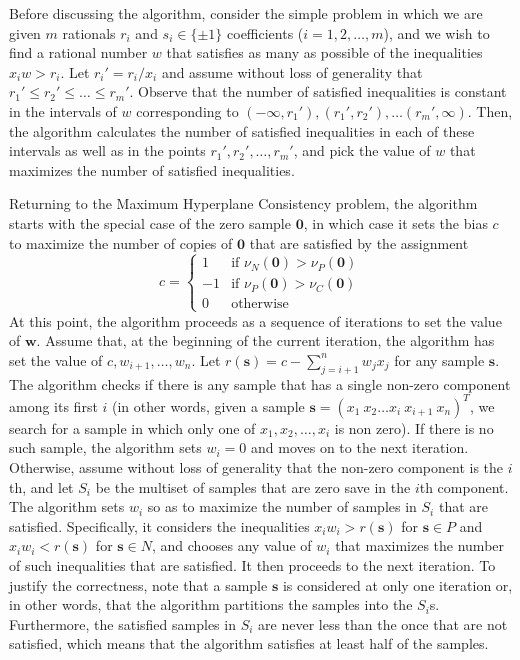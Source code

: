 \documentclass[11pt]{article}
\theoremstyle{definition}
\newcommand{\vect}[1]{\mathbf{#1}}
\begin{document}
Before discussing the algorithm, 
consider the simple problem in which we are given $m$ rationals $r_i$ and 
$s_i \in \{ \pm 1 \}$ coefficients ($i = 1, 2, \dots, m$),
and we wish to find a rational number $w$ that satisfies as many as possible of the inequalities
$x_i w > r_i$.
Let $r_i' = r_i / x_i$ and assume without loss of generality that 
$r_1' \leq r_2' \leq \dots \leq r_m'$.
Observe that the number of satisfied inequalities is constant in the 
intervals of $w$ corresponding to
$(-\infty, r_1'), (r_1', r_2'), \dots (r_m', \infty)$.
Then, the algorithm calculates the number of satisfied inequalities in each of these intervals 
as well as in the points $r_1', r_2', \dots, r_m'$, and pick the
value of $w$ that maximizes the number of satisfied inequalities. 

Returning to the Maximum Hyperplane Consistency problem,  
the algorithm starts with the special case of the zero sample $\vect{0}$, in which 
case it sets the bias $c$ to maximize the number of copies of $\vect{0}$ that are satisfied by
the assignment 
$$c = \begin{cases} 
1 & \text{if } \nu_N(\vect{0}) > \nu_P(\vect{0})\\
-1 & \text{if } \nu_P(\vect{0}) > \nu_C(\vect{0})\\
0 & \text{otherwise}
\end{cases}$$
At this point, the algorithm proceeds as a sequence of iterations to set the value of $\vect{w}$.
Assume that, at the beginning of the current iteration,
the algorithm has set the value of $c, w_{i+1}, \dots, w_n$.
Let $r(\vect{s}) = c - \sum_{j = i + 1}^n w_j x_j$ for any sample $\vect{s}$.
The algorithm checks if there is any sample that has a single non-zero component among its first $i$
(in other words, given a sample $\vect{s} = (x_1 ~ x_2 \dots x_i ~ x_{i+1} ~ x_n)^T$,
we search for a sample in which only one of $x_1, x_2, \dots , x_i$ is non zero).
If there is no such sample, the algorithm sets $w_i = 0$ and moves on to the next iteration.
Otherwise, assume without loss of generality that the non-zero component is the $i$th,
and let $S_i$ be the multiset of samples that are zero save in the $i$th component. 
The algorithm sets $w_i$ so as to maximize the number of samples in $S_i$ that are satisfied. 
Specifically, it considers the inequalities 
$x_i w_i > r(\vect{s})$ for $\vect{s} \in P$ and 
$x_i w_i < r(\vect{s})$ for $\vect{s} \in N$, and
chooses any value of $w_i$ that maximizes the number of such inequalities that are satisfied. 
It then proceeds to the next iteration.
To justify the correctness, note that a sample $\vect{s}$ is considered at only one iteration or,
in other words, that the algorithm partitions the samples into the $S_i$s.
Furthermore, the satisfied samples in $S_i$ are never less than the once that are not satisfied,
which means that the algorithm satisfies at least half of the samples.
\end{document}

